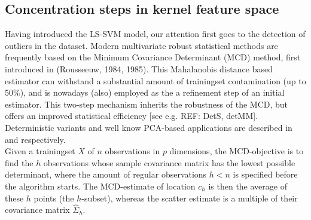 \documentclass[preprint,12pt]{elsarticle}
\begin{document}
%	
	
	\subsection{Concentration steps in kernel feature space}
	
	Having introduced the LS-SVM model, our attention first goes to the detection of outliers in the dataset. Modern multivariate robust statistical methods are frequently based on the Minimum Covariance Determinant (MCD) method, first introduced in  (Rousseeuw, 1984, 1985). This Mahalanobis distance based estimator can withstand a substantial amount of trainingset contamination (up to 50\%), and is nowadays (also) employed as the a refinement step of an initial estimator. This two-step mechanism inherits the robustness of the MCD, but offers an improved statistical efficiency [see e.g. REF: DetS, detMM]. Deterministic variants and well know PCA-based applications are described in \cite{hubert2012deterministic} and \cite{hubert2005robpca} respectively. \\
	
	Given a trainingset $X$ of $n$ observations in $p$ dimensions, the MCD-objective is to find the $h$ observations whose sample covariance matrix has the lowest possible determinant, where the amount of regular observations $h < n$ is specified before the algorithm starts. The MCD-estimate of location $c_h$ is then the average of these $h$ points (the $h$-subset), whereas the scatter estimate is a multiple of their covariance matrix $\hat{\Sigma}_{h}$. 
	
\end{document}
